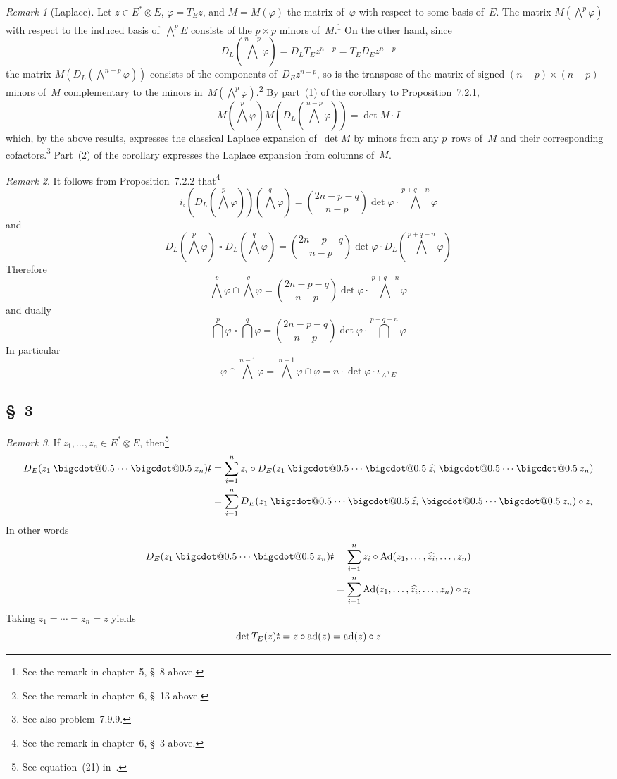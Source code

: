 \documentclass[letterpaper,12pt]{article}
\makeatletter
\DeclareMathOperator{\ad}{ad}
\DeclareMathOperator{\Ad}{Ad}
\newcommand{\bigcdot}[1]{\mathbin{\mathpalette\bigcdot@{#1}}}
\newcommand{\bigcdot@}[2]{%
  \sbox0{$#1\vcenter{}$}%
  \sbox2{$#1\cdot\m@th$}%
  \hbox{%
    \hfil
    \raise\ht0\hbox{%
      \scalebox{#2}{%
        \lower\ht0\hbox{$#1\bullet\m@th$}%
      }%
    }%
    \hfil
  }%
}
\newcommand{\sect}{\cap}
\newcommand{\bigsect}{\bigcap}
\newcommand{\medsect}{{\textstyle\bigsect}}
\newcommand{\after}{\circ}
\newcommand{\mult}{\cdot}
\newcommand{\tprod}{\otimes}
\newcommand{\eprod}{\wedge}
\newcommand{\bigeprod}{\bigwedge}
\newcommand{\medeprod}{{\textstyle\bigeprod}}
\newcommand{\mprod}{\bigcdot{0.5}}
\newcommand{\bprod}{\mathbin{\square}}
\newcommand{\delete}{\widehat}
\newcommand{\multi}[4]{#2_{#3}#1\cdots#1#2_{#4}}
\newcommand{\mprods}[3]{\multi{\mprod}{#1}{#2}{#3}}
\newcommand{\stroked}[1]{\mathrlap{\text{\kern0.05em-}}#1}
\newcommand{\unit}{\stroked{t}}
\theoremstyle{definition}
\theoremstyle{remark}
\newtheorem*{rmk}{Remark}
\makeatother
\begin{document}
\begin{rmk}[Laplace]
Let \(z\in E^*\tprod E\), \(\varphi=T_Ez\), and \(M=M(\varphi)\) the matrix of~\(\varphi\) with respect to some basis of~\(E\). The matrix \(M(\medeprod^p\varphi)\) with respect to the induced basis of~\(\medeprod^p E\) consists of the \(p\times p\) minors of~\(M\).\footnote{See the remark in chapter~5, \S~8 above.} On the other hand, since
\[D_L(\medeprod^{n-p}\varphi)=D_LT_Ez^{n-p}=T_ED_Ez^{n-p}\]
the matrix \(M(D_L(\medeprod^{n-p}\varphi))\) consists of the components of~\(D_Ez^{n-p}\), so is the transpose of the matrix of signed \((n-p)\times(n-p)\) minors of~\(M\) complementary to the minors in~\(M(\medeprod^p\varphi)\).\footnote{See the remark in chapter~6, \S~13 above.} By part~(1) of the corollary to Proposition~7.2.1,
\[M(\medeprod^p\varphi)M(D_L(\medeprod^{n-p}\varphi))=\det M\mult I\]
which, by the above results, expresses the classical Laplace expansion of~\(\det M\) by minors from any \(p\)~rows of~\(M\) and their corresponding cofactors.\footnote{See also problem~7.9.9.} Part~(2) of the corollary expresses the Laplace expansion from columns of~\(M\).
\end{rmk}

\begin{rmk}
It follows from Proposition~7.2.2 that\footnote{See the remark in chapter~6, \S~3 above.}
\[i_{\bprod}(D_L(\medeprod^p\varphi))(\medeprod^q\varphi)=\binom{2n-p-q}{n-p}\det\varphi\mult\medeprod^{p+q-n}\varphi\tag{1}\]
and
\[D_L(\medeprod^p\varphi)\bprod D_L(\medeprod^q\varphi)=\binom{2n-p-q}{n-p}\det\varphi\mult D_L(\medeprod^{p+q-n}\varphi)\tag{2}\]
Therefore
\[\medeprod^p\varphi\sect\medeprod^q\varphi=\binom{2n-p-q}{n-p}\det\varphi\mult\medeprod^{p+q-n}\varphi\]
and dually
\[\medsect^p\varphi\bprod\medsect^q\varphi=\binom{2n-p-q}{n-p}\det\varphi\mult\medsect^{p+q-n}\varphi\]
In particular
\[\varphi\sect\medeprod^{n-1}\varphi=\medeprod^{n-1}\varphi\sect\varphi=n\mult\det\varphi\mult\iota_{\eprod^0 E}\]
\end{rmk}

\subsection*{\S~3}
\begin{rmk}
If \(z_1,\ldots,z_n\in E^*\tprod E\), then\footnote{See equation~(21) in~\cite{greub4}.}
\begin{align*}
D_E(\mprods{z}{1}{n})\unit&=\sum_{i=1}^n z_i\after D_E(z_1\mprod\cdots\mprod\delete{z_i}\mprod\cdots\mprod z_n)\\
	&=\sum_{i=1}^n D_E(z_1\mprod\cdots\mprod\delete{z_i}\mprod\cdots\mprod z_n)\after z_i
\end{align*}
In other words
\begin{align*}
D_E(\mprods{z}{1}{n})\unit&=\sum_{i=1}^n z_i\after\Ad(z_1,\ldots,\delete{z_i},\ldots,z_n)\\
	&=\sum_{i=1}^n\Ad(z_1,\ldots,\delete{z_i},\ldots,z_n)\after z_i
\end{align*}
Taking \(z_1=\cdots=z_n=z\) yields
\[\det T_E(z)\unit=z\after\ad(z)=\ad(z)\after z\]
\end{rmk}
\end{document}
